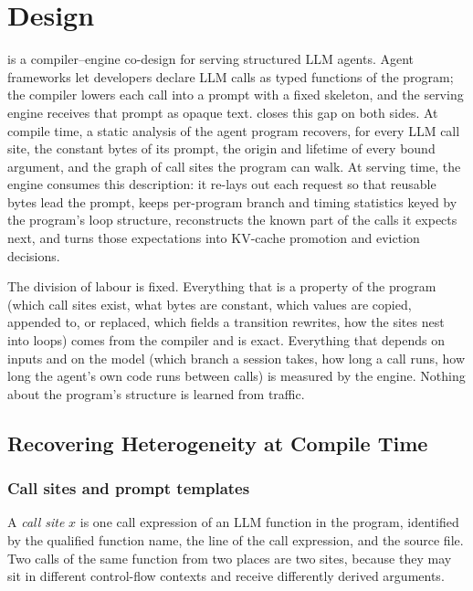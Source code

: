\section{Design}
\sysname is a compiler--engine co-design for serving structured LLM agents. Agent frameworks let developers declare LLM calls as typed functions of the program; the compiler lowers each call into a prompt with a fixed skeleton, and the serving engine receives that prompt as opaque text. \sysname closes this gap on both sides. At compile time, a static analysis of the agent program recovers, for every LLM call site, the constant bytes of its prompt, the origin and lifetime of every bound argument, and the graph of call sites the program can walk. At serving time, the engine consumes this description: it re-lays out each request so that reusable bytes lead the prompt, keeps per-program branch and timing statistics keyed by the program's loop structure, reconstructs the known part of the calls it expects next, and turns those expectations into KV-cache promotion and eviction decisions.

The division of labour is fixed. Everything that is a property of the program (which call sites exist, what bytes are constant, which values are copied, appended to, or replaced, which fields a transition rewrites, how the sites nest into loops) comes from the compiler and is exact. Everything that depends on inputs and on the model (which branch a session takes, how long a call runs, how long the agent's own code runs between calls) is measured by the engine. Nothing about the program's structure is learned from traffic.

\subsection{Recovering Heterogeneity at Compile Time}
\label{subsec:static}

\subsubsection{Call sites and prompt templates}
A \emph{call site} $x$ is one call expression of an LLM function in the program, identified by the qualified function name, the line of the call expression, and the source file. Two calls of the same function from two places are two sites, because they may sit in different control-flow contexts and receive differently derived arguments.

